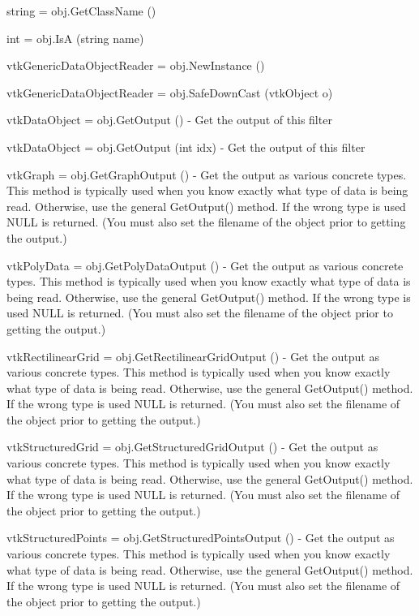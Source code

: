 \begin{DoxyItemize}
\item {\ttfamily string = obj.\-Get\-Class\-Name ()}  
\item {\ttfamily int = obj.\-Is\-A (string name)}  
\item {\ttfamily vtk\-Generic\-Data\-Object\-Reader = obj.\-New\-Instance ()}  
\item {\ttfamily vtk\-Generic\-Data\-Object\-Reader = obj.\-Safe\-Down\-Cast (vtk\-Object o)}  
\item {\ttfamily vtk\-Data\-Object = obj.\-Get\-Output ()} -\/ Get the output of this filter  
\item {\ttfamily vtk\-Data\-Object = obj.\-Get\-Output (int idx)} -\/ Get the output of this filter  
\item {\ttfamily vtk\-Graph = obj.\-Get\-Graph\-Output ()} -\/ Get the output as various concrete types. This method is typically used when you know exactly what type of data is being read. Otherwise, use the general Get\-Output() method. If the wrong type is used N\-U\-L\-L is returned. (You must also set the filename of the object prior to getting the output.)  
\item {\ttfamily vtk\-Poly\-Data = obj.\-Get\-Poly\-Data\-Output ()} -\/ Get the output as various concrete types. This method is typically used when you know exactly what type of data is being read. Otherwise, use the general Get\-Output() method. If the wrong type is used N\-U\-L\-L is returned. (You must also set the filename of the object prior to getting the output.)  
\item {\ttfamily vtk\-Rectilinear\-Grid = obj.\-Get\-Rectilinear\-Grid\-Output ()} -\/ Get the output as various concrete types. This method is typically used when you know exactly what type of data is being read. Otherwise, use the general Get\-Output() method. If the wrong type is used N\-U\-L\-L is returned. (You must also set the filename of the object prior to getting the output.)  
\item {\ttfamily vtk\-Structured\-Grid = obj.\-Get\-Structured\-Grid\-Output ()} -\/ Get the output as various concrete types. This method is typically used when you know exactly what type of data is being read. Otherwise, use the general Get\-Output() method. If the wrong type is used N\-U\-L\-L is returned. (You must also set the filename of the object prior to getting the output.)  
\item {\ttfamily vtk\-Structured\-Points = obj.\-Get\-Structured\-Points\-Output ()} -\/ Get the output as various concrete types. This method is typically used when you know exactly what type of data is being read. Otherwise, use the general Get\-Output() method. If the wrong type is used N\-U\-L\-L is returned. (You must also set the filename of the object prior to getting the output.)  

\end{DoxyItemize}
